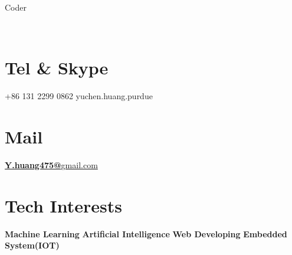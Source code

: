 \documentclass[]{friggeri-cv}
\begin{document}
      {Coder}
      

\begin{aside}
    ~
  \section{Tel \& Skype}
    +86 131 2299 0862
    yuchen.huang.purdue
    ~
  \section{Mail}
    \href{mailto:y.huang475@gmail.com}{\textbf{Y.huang475@}{gmail.com}}
    ~
  \section{Tech Interests}
	\textbf{Machine Learning  }
	\textbf{Artificial Intelligence  }
	\textbf{Web Developing  }
	\textbf{Embedded System(IOT)  }  	
	~  	

\end{aside}
\end{document}
